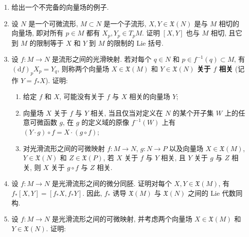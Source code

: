 \begin{RiemannExercise}
\begin{enumerate}[label=(\arabic*),ref=\arabic*,leftmargin=*]
\begin{enumerate}[label=(\alph*),leftmargin=*]
\item 计算 $i,j=1,2,3$ 时的 Lie 括号 $[X_i,X_j]$.
\item 证明 $\operatorname{span}\{X_1,X_2,X_3\}$ 是 $\mathfrak{X}(\mathbb{R}^3)$ 的 Lie 子代数, 同构于 $(\mathbb{R}^3,\times)$.
\item 计算 $X_1,X_2,X_3$ 的流 $\psi_{1,t},\psi_{2,t},\psi_{3,t}$.
\item 证明当 $i\ne j$ 时, $\psi_{i,\frac{\pi}{2}}\circ\psi_{j,\frac{\pi}{2}}\ne\psi_{j,\frac{\pi}{2}}\circ\psi_{i,\frac{\pi}{2}}$.
\end{enumerate}
\item\label{ex:noncomplete-vector-field} 给出一个不完备的向量场的例子.
\item\label{ex:lie-bracket-tangent-to-submanifold} 设 $N$ 是一个可微流形, $M\subset N$ 是一个子流形, $X,Y\in\mathfrak{X}(N)$ 是与 $M$ 相切的向量场, 即对所有 $p\in M$ 都有 $X_p,Y_p\in T_pM$. 证明 $[X,Y]$ 也与 $M$ 相切, 且它到 $M$ 的限制等于 $X$ 和 $Y$ 到 $M$ 的限制的 Lie 括号.
\item\label{ex:related-vector-fields} 设 $f:M\to N$ 是流形之间的光滑映射. 若对每个 $q\in N$ 和 $p\in f^{-1}(q)\subset M$, 有 $(\mathrm{d}f)_pX_p=Y_q$, 则称两个向量场 $X\in\mathfrak{X}(M)$ 和 $Y\in\mathfrak{X}(N)$ \textbf{关于 $f$ 相关} (记作 $Y=f_*X$). 证明:
\begin{enumerate}[label=(\alph*),leftmargin=*]
\item 给定 $f$ 和 $X$, 可能没有关于 $f$ 与 $X$ 相关的向量场 $Y$;
\item 向量场 $X$ 关于 $f$ 与 $Y$ 相关, 当且仅当对定义在 $N$ 的某个开子集 $W$ 上的任意可微函数 $g$, 在 $g$ 的定义域的原像 $f^{-1}(W)$ 上有 $(Y\cdot g)\circ f=X\cdot(g\circ f)$;
\item 对光滑流形之间的可微映射 $f:M\to N$, $g:N\to P$ 以及向量场 $X\in\mathfrak{X}(M)$, $Y\in\mathfrak{X}(N)$ 和 $Z\in\mathfrak{X}(P)$, 若 $X$ 关于 $f$ 与 $Y$ 相关, 且 $Y$ 关于 $g$ 与 $Z$ 相关, 则 $X$ 关于 $g\circ f$ 与 $Z$ 相关.
\end{enumerate}
\item\label{ex:pushforward-preserves-lie-bracket} 设 $f:M\to N$ 是光滑流形之间的微分同胚. 证明对每个 $X,Y\in\mathfrak{X}(M)$, 有 $f_*[X,Y]=[f_*X,f_*Y]$. 因此, $f_*$ 诱导 $\mathfrak{X}(M)$ 与 $\mathfrak{X}(N)$ 之间的 Lie 代数同构.
\item\label{ex:related-vector-fields-and-integral-curves} 设 $f:M\to N$ 是光滑流形之间的可微映射, 并考虑两个向量场 $X\in\mathfrak{X}(M)$ 和 $Y\in\mathfrak{X}(N)$. 证明:
\begin{enumerate}[label=(\alph*),leftmargin=*]

\end{enumerate}
\end{enumerate}
\end{RiemannExercise}
